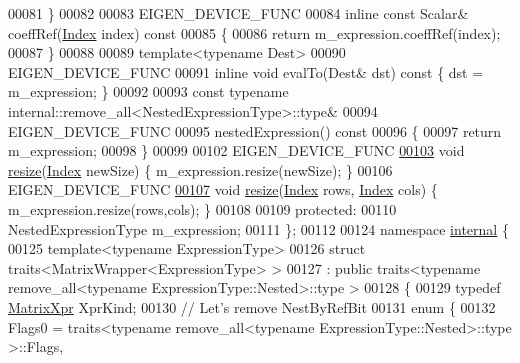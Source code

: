 \begin{DoxyCode}
00081     \}
00082 
00083     EIGEN\_DEVICE\_FUNC
00084     \textcolor{keyword}{inline} \textcolor{keyword}{const} Scalar& coeffRef(\hyperlink{namespace_eigen_a62e77e0933482dafde8fe197d9a2cfde}{Index} index)\textcolor{keyword}{ const}
00085 \textcolor{keyword}{    }\{
00086       \textcolor{keywordflow}{return} m\_expression.coeffRef(index);
00087     \}
00088 
00089     \textcolor{keyword}{template}<\textcolor{keyword}{typename} Dest>
00090     EIGEN\_DEVICE\_FUNC
00091     \textcolor{keyword}{inline} \textcolor{keywordtype}{void} evalTo(Dest& dst)\textcolor{keyword}{ const }\{ dst = m\_expression; \}
00092 
00093     \textcolor{keyword}{const} \textcolor{keyword}{typename} internal::remove\_all<NestedExpressionType>::type& 
00094     EIGEN\_DEVICE\_FUNC
00095     nestedExpression()\textcolor{keyword}{ const }
00096 \textcolor{keyword}{    }\{
00097       \textcolor{keywordflow}{return} m\_expression;
00098     \}
00099 
00102     EIGEN\_DEVICE\_FUNC
\hyperlink{group___core___module_a04bcb4140d2b2f9bf571efddac135a21}{00103}     \textcolor{keywordtype}{void} \hyperlink{group___core___module_a04bcb4140d2b2f9bf571efddac135a21}{resize}(\hyperlink{namespace_eigen_a62e77e0933482dafde8fe197d9a2cfde}{Index} newSize) \{ m\_expression.resize(newSize); \}
00106     EIGEN\_DEVICE\_FUNC
\hyperlink{group___core___module_aaead58c7011ff95bb588d9bb242aca8a}{00107}     \textcolor{keywordtype}{void} \hyperlink{group___core___module_aaead58c7011ff95bb588d9bb242aca8a}{resize}(\hyperlink{namespace_eigen_a62e77e0933482dafde8fe197d9a2cfde}{Index} rows, \hyperlink{namespace_eigen_a62e77e0933482dafde8fe197d9a2cfde}{Index} cols) \{ m\_expression.resize(rows,cols); \}
00108 
00109   \textcolor{keyword}{protected}:
00110     NestedExpressionType m\_expression;
00111 \};
00112 
00124 \textcolor{keyword}{namespace }\hyperlink{namespaceinternal}{internal} \{
00125 \textcolor{keyword}{template}<\textcolor{keyword}{typename} ExpressionType>
00126 \textcolor{keyword}{struct }traits<MatrixWrapper<ExpressionType> >
00127  : \textcolor{keyword}{public} traits<typename remove\_all<typename ExpressionType::Nested>::type >
00128 \{
00129   \textcolor{keyword}{typedef} \hyperlink{struct_eigen_1_1_matrix_xpr}{MatrixXpr} XprKind;
00130   \textcolor{comment}{// Let's remove NestByRefBit}
00131   \textcolor{keyword}{enum} \{
00132     Flags0 = traits<typename remove\_all<typename ExpressionType::Nested>::type >::Flags,

\end{DoxyCode}
